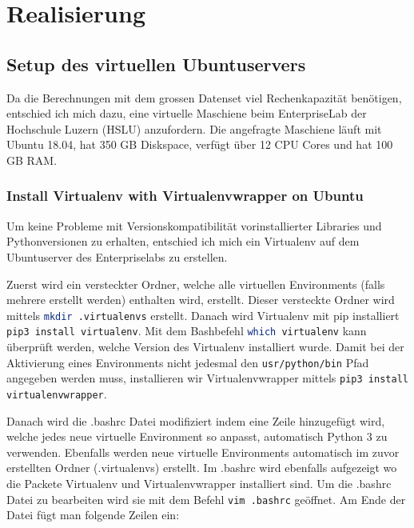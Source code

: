 \chapter{Realisierung}
\label{ch:Realisierung}


\section{Setup des virtuellen Ubuntuservers}
Da die Berechnungen mit dem grossen Datenset viel Rechenkapazität benötigen, entschied ich mich dazu, eine virtuelle Maschiene beim EnterpriseLab der Hochschule Luzern (HSLU) anzufordern. Die angefragte Maschiene läuft mit Ubuntu 18.04, hat 350 GB Diskspace, verfügt über 12 CPU Cores und hat 100 GB RAM. 

\subsection{Install Virtualenv with Virtualenvwrapper on Ubuntu}
Um keine Probleme mit Versionskompatibilität vorinstallierter Libraries und Pythonversionen zu erhalten, entschied ich mich ein Virtualenv auf dem Ubuntuserver des Enterpriselabs zu erstellen.

Zuerst wird ein versteckter Ordner, welche alle virtuellen Environments (falls mehrere erstellt werden) enthalten wird, erstellt. Dieser versteckte Ordner wird mittels \lstinline[language=Bash]{mkdir .virtualenvs} erstellt.
Danach wird Virtualenv mit pip installiert \lstinline[language=bash]{pip3 install virtualenv}. Mit dem Bashbefehl \lstinline[language=bash]{which virtualenv} kann überprüft werden, welche Version des Virtualenv installiert wurde. Damit bei der Aktivierung eines Environments nicht jedesmal den \lstinline[language=bash]{usr/python/bin} Pfad angegeben werden muss, installieren wir Virtualenvwrapper mittels \lstinline[language=bash]{pip3 install virtualenvwrapper}.

Danach wird die .bashrc Datei modifiziert indem eine Zeile hinzugefügt wird, welche jedes neue virtuelle Environment so anpasst, automatisch Python 3 zu verwenden. Ebenfalls werden neue virtuelle Environments automatisch im zuvor erstellten Ordner (.virtualenvs) erstellt. Im .bashrc wird ebenfalls aufgezeigt wo die Packete Virtualenv und Virtualenvwrapper installiert sind. Um die .bashrc Datei zu bearbeiten wird sie mit dem Befehl \lstinline[language=bash]{vim .bashrc} geöffnet. Am Ende der Datei fügt man folgende Zeilen ein: 


